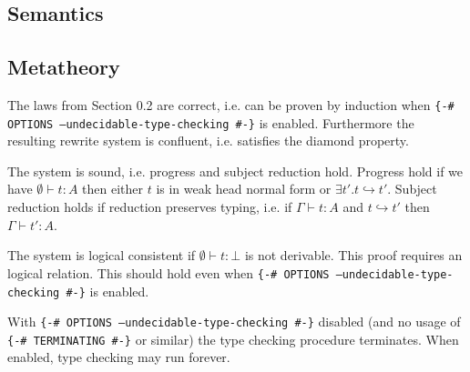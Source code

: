 \documentclass[runningheads,fleqn]{llncs}
\begin{document}
\subsection{Semantics}
\bigskip
{}
\bigskip
{}
\bigskip
{}
\bigskip
{}
\bigskip

\subsection{Metatheory}

\begin{theorem}
The laws from Section 0.2 are correct, i.e. can be proven by induction when \texttt{\{-\# OPTIONS --undecidable-type-checking \#-\}} is enabled.
Furthermore the resulting rewrite system is confluent, i.e. satisfies the diamond property. 
\end{theorem}

\begin{theorem}[Soundness]
The system is sound, i.e. progress and subject reduction hold. 
Progress hold if we have $∅ ⊢ t : A$ then either $t$ is in weak head normal form or $∃ t'. t ↪ t'$. 
Subject reduction holds if reduction preserves typing, i.e. if $Γ ⊢ t : A$ and $t ↪ t'$ then $Γ ⊢ t' : A$.
\end{theorem}

\begin{theorem}
The system is logical consistent if $∅ ⊢ t : ⊥$ is not derivable. 
This proof requires an logical relation.
This should hold even when \texttt{\{-\# OPTIONS --undecidable-type-checking \#-\}} is enabled.
\end{theorem}

\begin{theorem}
With \texttt{\{-\# OPTIONS --undecidable-type-checking \#-\}} disabled (and no usage of \texttt{\{-\# TERMINATING \#-\}} or similar) the type checking procedure terminates. When enabled, type checking may run forever. 
\end{theorem}

\printbibliography{}
\end{document}
